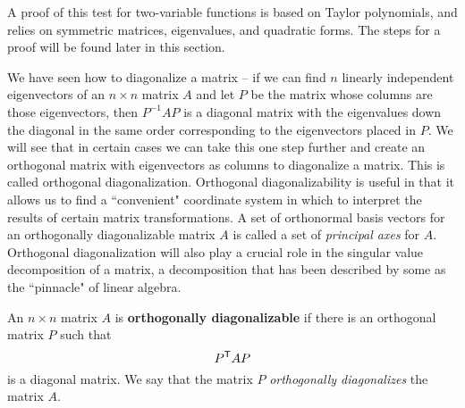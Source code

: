 A proof of this test for two-variable functions is based on Taylor polynomials, and relies on symmetric matrices, eigenvalues, and quadratic forms. The steps for a proof will be found later in this section.


\label{sec:orthog_diag_intro}

We have seen how to diagonalize a matrix -- if we can find $n$ linearly independent eigenvectors of an $n\times n$ matrix $A$ and let $P$ be the matrix whose columns are those eigenvectors,  then $P^{-1}AP$ is a diagonal matrix with the eigenvalues down the diagonal in the same order corresponding to the eigenvectors placed in $P$. We will see that in certain cases we can take this one step further and create an orthogonal matrix with eigenvectors as columns to diagonalize a matrix. This is called orthogonal diagonalization. Orthogonal diagonalizability is useful in that it allows us to find a ``convenient" coordinate system in which to interpret the results of certain matrix transformations. A set of orthonormal basis vectors for an orthogonally diagonalizable matrix $A$ is called a set of \emph{principal axes} for $A$. Orthogonal diagonalization will also play a crucial role in the singular value decomposition of a matrix, a decomposition that has been described by some as the ``pinnacle" of linear algebra.


\begin{definition} \label{def:7_a_orthogonal _diagonalization} An $n \times n$ matrix $A$ is \textbf{orthogonally diagonalizable} if there is an orthogonal matrix $P$ such that
\[P^{\mathsf{T}}AP\]
is a diagonal matrix. We say that the matrix $P$ \emph{orthogonally diagonalizes} the matrix $A$.
\end{definition}

